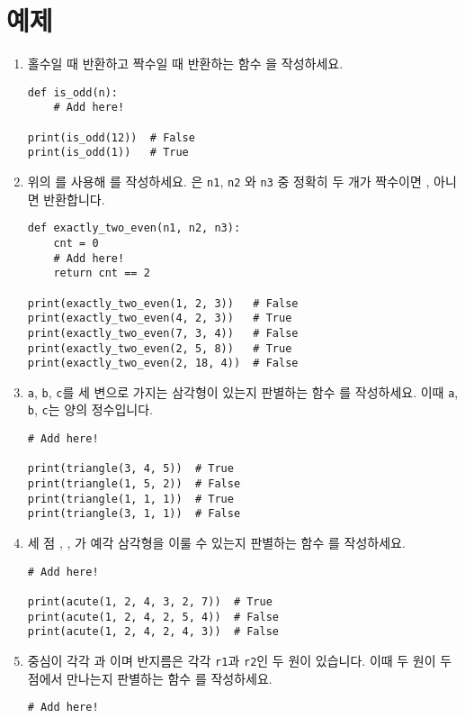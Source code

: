 \documentclass[../main.tex]{subfiles}
\begin{document}
\section{예제}
\begin{enumerate}
\item 홀수일 때  반환하고 짝수일 때  반환하는 함수 을 작성하세요.
\begin{verbatim}
def is_odd(n):
    # Add here!

print(is_odd(12))  # False
print(is_odd(1))   # True
\end{verbatim}

\item 위의 를 사용해 를 작성하세요. 은 \texttt{n1}, \texttt{n2} 와 \texttt{n3} 중 정확히 두 개가 짝수이면 \pytrue, 아니면  반환합니다.
\begin{verbatim}
def exactly_two_even(n1, n2, n3):
    cnt = 0
    # Add here!
    return cnt == 2

print(exactly_two_even(1, 2, 3))   # False
print(exactly_two_even(4, 2, 3))   # True
print(exactly_two_even(7, 3, 4))   # False
print(exactly_two_even(2, 5, 8))   # True
print(exactly_two_even(2, 18, 4))  # False
\end{verbatim}

\item \texttt{a}, \texttt{b}, \texttt{c}를 세 변으로 가지는 삼각형이 있는지 판별하는 함수 를 작성하세요.
이때 \texttt{a}, \texttt{b}, \texttt{c}는 양의 정수입니다.
\begin{verbatim}
# Add here!

print(triangle(3, 4, 5))  # True
print(triangle(1, 5, 2))  # False
print(triangle(1, 1, 1))  # True
print(triangle(3, 1, 1))  # False
\end{verbatim}

\item 세 점 , , 가 예각 삼각형을 이룰 수 있는지 판별하는 함수 를 작성하세요.
\begin{verbatim}
# Add here!

print(acute(1, 2, 4, 3, 2, 7))  # True
print(acute(1, 2, 4, 2, 5, 4))  # False
print(acute(1, 2, 4, 2, 4, 3))  # False
\end{verbatim}

\item 중심이 각각 과 이며 반지름은 각각 \texttt{r1}과 \texttt{r2}인 두 원이 있습니다.
이때 두 원이 두 점에서 만나는지 판별하는 함수 를 작성하세요.
\begin{verbatim}
# Add here!


\end{verbatim}
\end{enumerate}
\end{document}
